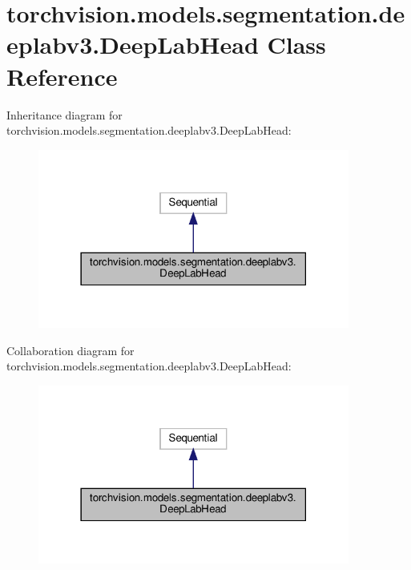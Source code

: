 \hypertarget{classtorchvision_1_1models_1_1segmentation_1_1deeplabv3_1_1DeepLabHead}{}\section{torchvision.\+models.\+segmentation.\+deeplabv3.\+Deep\+Lab\+Head Class Reference}
\label{classtorchvision_1_1models_1_1segmentation_1_1deeplabv3_1_1DeepLabHead}


Inheritance diagram for torchvision.\+models.\+segmentation.\+deeplabv3.\+Deep\+Lab\+Head\+:
\nopagebreak
\begin{figure}[H]
\begin{center}
\leavevmode
\includegraphics[width=290pt]{classtorchvision_1_1models_1_1segmentation_1_1deeplabv3_1_1DeepLabHead__inherit__graph}
\end{center}
\end{figure}


Collaboration diagram for torchvision.\+models.\+segmentation.\+deeplabv3.\+Deep\+Lab\+Head\+:
\nopagebreak
\begin{figure}[H]
\begin{center}
\leavevmode
\includegraphics[width=290pt]{classtorchvision_1_1models_1_1segmentation_1_1deeplabv3_1_1DeepLabHead__coll__graph}
\end{center}
\end{figure}
